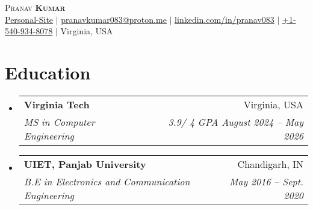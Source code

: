 \documentclass[letterpaper,11pt]{article}
\makeatletter
\newcommand{\resumeSubheading}[4]{
  \vspace{-2pt}\item
    \begin{tabular*}{0.97\textwidth}[t]{l@{\extracolsep{\fill}}r}
      \textbf{#1} & #2 \\
      \textit{\small#3} & \textit{\small #4} \\
    \end{tabular*}\vspace{-9pt}
}
\newcommand{\resumeSubHeadingListStart}{\begin{itemize}[leftmargin=0.15in, label={}]}
\newcommand{\resumeSubHeadingListEnd}{\end{itemize}}
\makeatother
\begin{document}

\begin{center}
    {\Huge \scshape Pranav \textbf{Kumar}} \\ \vspace{1pt}
    \href{https://pranav083.github.io/}{\underline{Personal-Site}} $|$
    \href{mailto:pranavkumar083@proton.me}{\underline{pranavkumar083@proton.me}} $|$
    \href{https://linkedin.com/in/pranav083}{\underline{linkedin.com/in/pranav083}} $|$
    \small{\underline{+1-540-934-8078}} $|$
    \small{ Virginia, USA}   
\end{center}\vspace{-10pt}

\section{Education}
  \resumeSubHeadingListStart
    \resumeSubheading
      {Virginia Tech}{Virginia, USA}
      {MS in Computer Engineering }{3.9/ 4 GPA August 2024 -- May 2026}

    \resumeSubheading
      {UIET, Panjab University}{Chandigarh, IN}
      {B.E in Electronics and Communication Engineering }{ May 2016 -- Sept. 2020}

  \resumeSubHeadingListEnd


\end{document}

